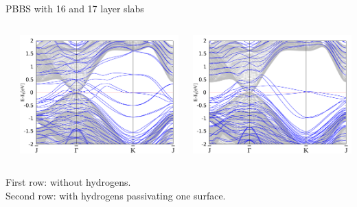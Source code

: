 \begin{frame}{PBBS with 16 and 17 layer slabs}
\begin{columns}
\begin{column}{.34\linewidth}
		\end{column}
		\begin{column}{.34\linewidth}
			\centering
			\includegraphics[width=\linewidth]{Te_termination/bulk+17_layers_no_dos_-2_2.pdf}
		\end{column}
		\begin{column}{.34\linewidth}
			\centering
			\includegraphics[width=\linewidth]{Hg_termination/bulk+17_layers_no_dos_-2_2.pdf}
		\end{column}
	\end{columns}
	\vspace{.3cm}
	\footnotesize{
		First row: without hydrogens. \\Second row: with hydrogens passivating one surface.}
\end{frame}

